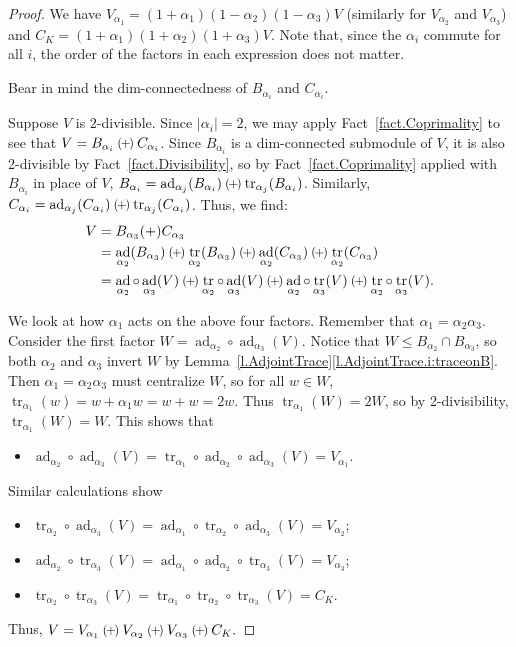 \documentclass[a4paper, 11pt]{amsart}
\theoremstyle{plain}
\theoremstyle{definition}
\theoremstyle{remark}
\newcommand{\qoplus}{\mathbin{\scalerel*{\left(\mkern-2mu+\mkern-2mu\right)}{\bigcirc}}}
\DeclareMathOperator{\ad}{ad}
\DeclareMathOperator{\tr}{tr}
\begin{document}
\begin{proof}
We have $V_{\alpha_{1}}=(1+\alpha_{1})(1-\alpha_{2})(1-\alpha_{3})V$ (similarly for $V_{\alpha_{2}}$ and $V_{\alpha_{3}}$) and $C_{K}=(1+\alpha_{1})(1+\alpha_{2})(1+\alpha_{3})V$.  Note that,
since the $\alpha_{i}$ commute for all $i$, the order of the factors in each expression does not matter.

Bear in mind the dim-connectedness of $B_{\alpha_i}$ and $C_{\alpha_i}$.

Suppose $V$ is $2$-divisible. Since $|\alpha_{i}|=2$, we may apply Fact~\ref{fact.Coprimality} to see that $V=B_{\alpha_{i}}\qoplus C_{\alpha_{i}}$.
Since $B_{\alpha_{i}}$ is a dim-connected submodule of $V$, it is
also $2$-divisible by Fact~\ref{fact.Divisibility}, so by Fact~\ref{fact.Coprimality} applied with $B_{\alpha_{i}}$ in place of $V$, $B_{\alpha_{i}}=\ad_{\alpha_{j}}(B_{\alpha_{i}})\qoplus\tr_{\alpha_{j}}(B_{\alpha_{i}})$. Similarly, $C_{\alpha_{i}}=\ad_{\alpha_{j}}(C_{\alpha_{i}})\qoplus\tr_{\alpha_{j}}(C_{\alpha_{i}})$. Thus, we find:
\begin{align*}
V &=B_{\alpha_{3}}(+)C_{\alpha_{3}}\\
&=\ad_{\alpha_{2}}(B_{\alpha_{3}})\qoplus \tr_{\alpha_{2}}(B_{\alpha_{3}})\qoplus \ad_{\alpha_{2}}(C_{\alpha_{3}})\qoplus \tr_{\alpha_{2}}(C_{\alpha_{3}})\\
&=\ad_{\alpha_{2}}\circ\ad_{\alpha_{3}}(V)\qoplus \tr_{\alpha_{2}}\circ\ad_{\alpha_{3}}(V)\qoplus \ad_{\alpha_{2}}\circ\tr_{\alpha_{3}}(V)\qoplus \tr_{\alpha_{2}}\circ\tr_{\alpha_{3}}(V).
\end{align*}

 We look at how $\alpha_{1}$ acts on the above four factors. Remember that $\alpha_{1}=\alpha_{2}\alpha_{3}$. Consider the first factor $W=\ad_{\alpha_{2}}\circ\ad_{\alpha_{3}}(V)$. Notice that $W\le B_{\alpha_{2}}\cap B_{\alpha_{3}}$, so
both $\alpha_{2}$ and $\alpha_{3}$ invert $W$ by Lemma~\ref{l.AdjointTrace}\eqref{l.AdjointTrace.i:traceonB}. Then $\alpha_{1}=\alpha_{2}\alpha_{3}$ must centralize $W$, so for all $w\in W$, $\tr_{\alpha_{1}}(w)=w+\alpha_{1}w=w+w=2w$.
Thus $\tr_{\alpha_{1}}(W)=2W$, so by 2-divisibility, $\tr_{\alpha_{1}}(W)=W$. This shows that
\begin{itemize}
    \item  $\ad_{\alpha_{2}}\circ\ad_{\alpha_{3}}(V) =\tr_{\alpha_{1}}\circ\ad_{\alpha_{2}}\circ\ad_{\alpha_{3}}(V)=V_{\alpha_{1}}.$
\end{itemize}
Similar calculations show
\begin{itemize}
    \item $\tr_{\alpha_{2}}\circ\ad_{\alpha_{3}}(V) = \ad_{\alpha_{1}}\circ\tr_{\alpha_{2}}\circ\ad_{\alpha_{3}}(V)=V_{\alpha_{2}}$;
    \item $\ad_{\alpha_{2}}\circ\tr_{\alpha_{3}}(V)=  \ad_{\alpha_{1}}\circ\ad_{\alpha_{2}}\circ\tr_{\alpha_{3}}(V)=V_{\alpha_{3}}$;
    \item $\tr_{\alpha_{2}}\circ\tr_{\alpha_{3}}(V) = \tr_{\alpha_{1}}\circ\tr_{\alpha_{2}}\circ\tr_{\alpha_{3}}(V)=C_{K}$.
\end{itemize}
Thus,
$
V=V_{\alpha_{1}}\qoplus V_{\alpha_{2}}\qoplus V_{\alpha_{3}}\qoplus C_{K}.
$


\end{proof}
\end{document}
